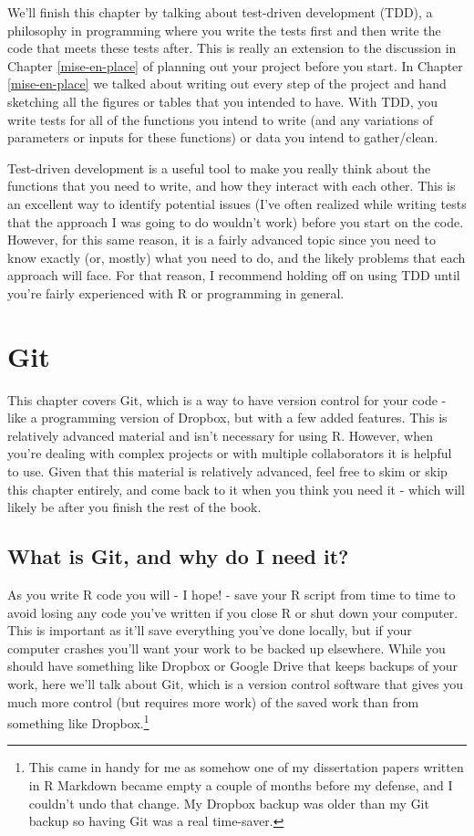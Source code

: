\documentclass[
]{krantz}
\begin{document}
We'll finish this chapter by talking about test-driven
development (TDD), a philosophy in programming where you
write the tests first and then write the code that meets
these tests after. This is really an extension to the
discussion in Chapter \ref{mise-en-place} of planning out
your project before you start. In Chapter
\ref{mise-en-place} we talked about writing out every step
of the project and hand sketching all the figures or tables
that you intended to have. With TDD, you write tests for all
of the functions you intend to write (and any variations of
parameters or inputs for these functions) or data you intend
to gather/clean.

Test-driven development is a useful tool to make you really
think about the functions that you need to write, and how
they interact with each other. This is an excellent way to
identify potential issues (I've often realized while writing
tests that the approach I was going to do wouldn't work)
before you start on the code. However, for this same reason,
it is a fairly advanced topic since you need to know exactly
(or, mostly) what you need to do, and the likely problems
that each approach will face. For that reason, I recommend
holding off on using TDD until you're fairly experienced
with R or programming in general.

\hypertarget{git}{%
\chapter{Git}\label{git}}

This chapter covers Git, which is a way to have version
control for your code - like a programming version of
Dropbox, but with a few added features. This is relatively
advanced material and isn't necessary for using R. However,
when you're dealing with complex projects or with multiple
collaborators it is helpful to use. Given that this material
is relatively advanced, feel free to skim or skip this
chapter entirely, and come back to it when you think you
need it - which will likely be after you finish the rest of
the book.

\hypertarget{what-is-git-and-why-do-i-need-it}{%
\section{What is Git, and why do I need
it?}\label{what-is-git-and-why-do-i-need-it}}

As you write R code you will - I hope! - save your R script
from time to time to avoid losing any code you've written if
you close R or shut down your computer. This is important as
it'll save everything you've done locally, but if your
computer crashes you'll want your work to be backed up
elsewhere. While you should have something like Dropbox or
Google Drive that keeps backups of your work, here we'll
talk about Git, which is a version control software that
gives you much more control (but requires more work) of the
saved work than from something like Dropbox.\footnote{This
  came in handy for me as somehow one of my dissertation
  papers written in R Markdown became empty a couple of
  months before my defense, and I couldn't undo that change.
  My Dropbox backup was older than my Git backup so having
  Git was a real time-saver.}
\end{document}
